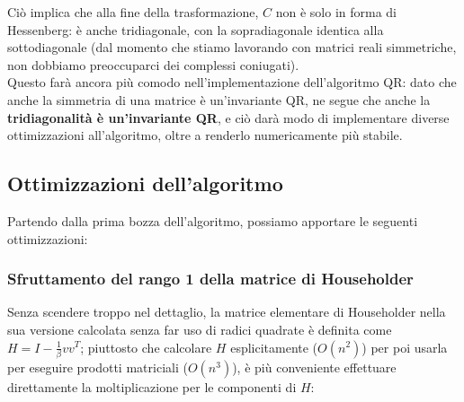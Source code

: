 Ciò implica che alla fine della trasformazione, $C$ non è solo in forma di 
Hessenberg: è anche tridiagonale, con la sopradiagonale identica alla 
sottodiagonale (dal momento che stiamo lavorando con matrici reali simmetriche, 
non dobbiamo preoccuparci dei complessi coniugati). \\
Questo farà ancora più comodo nell'implementazione dell'algoritmo QR: dato che 
anche la simmetria di una matrice è un'invariante QR, ne segue che anche la 
\textbf{tridiagonalità è un'invariante QR}, e ciò darà modo di implementare 
diverse ottimizzazioni all'algoritmo, oltre a renderlo numericamente più 
stabile.

\subsection{Ottimizzazioni dell'algoritmo}
Partendo dalla prima bozza dell'algoritmo, possiamo apportare le seguenti 
ottimizzazioni:

\subsubsection{Sfruttamento del rango 1 della matrice di Householder}
Senza scendere troppo nel dettaglio, la matrice elementare di Householder nella 
sua versione calcolata senza far uso di radici quadrate è definita come $H = I - 
\frac{1}{\beta}vv^T$; piuttosto che calcolare $H$ esplicitamente ($O(n^2)$) per 
poi usarla per eseguire prodotti matriciali ($O(n^3)$), è più conveniente 
effettuare direttamente la moltiplicazione per le componenti di $H$:

\noindent	
{}
\hfill
{}

